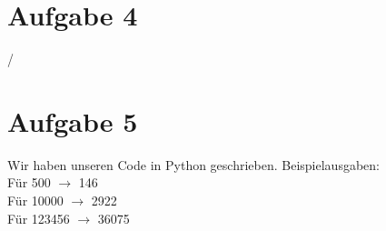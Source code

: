 \documentclass[12pt,german,a4paper]{article}
\begin{document}
\section*{Aufgabe 4}
/
\pagebreak
\section*{Aufgabe 5}

Wir haben unseren Code in Python geschrieben.
Beispielausgaben: \\
Für 500 $\rightarrow$ 146 \\
Für 10000 $\rightarrow $ 2922 \\
Für 123456 $\rightarrow $ 36075
\end{document}
